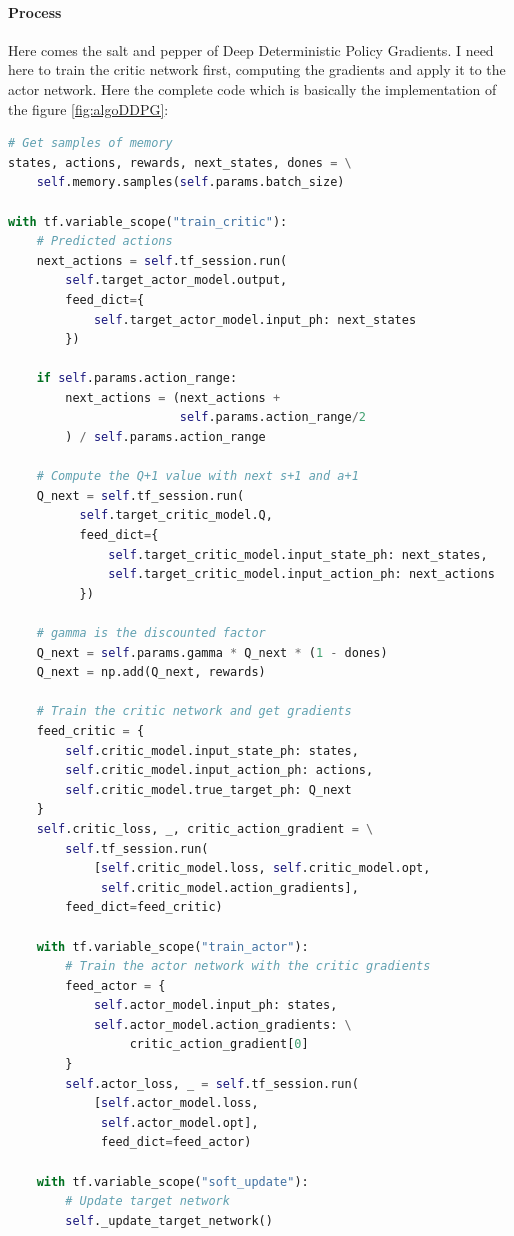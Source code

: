 \documentclass{article}
\begin{document}
\paragraph{Process}
Here comes the salt and pepper of Deep Deterministic Policy Gradients. I need
here to train the critic network first, computing the gradients and apply it to
the actor network. Here the complete code which is basically the implementation
of the figure \ref{fig:algoDDPG}:

\begin{lstlisting}[language=Python]
# Get samples of memory
states, actions, rewards, next_states, dones = \
    self.memory.samples(self.params.batch_size)

with tf.variable_scope("train_critic"):
    # Predicted actions
    next_actions = self.tf_session.run(
        self.target_actor_model.output,
        feed_dict={
            self.target_actor_model.input_ph: next_states
        })

    if self.params.action_range:
        next_actions = (next_actions +
                        self.params.action_range/2
        ) / self.params.action_range

    # Compute the Q+1 value with next s+1 and a+1
    Q_next = self.tf_session.run(
          self.target_critic_model.Q, 
          feed_dict={
              self.target_critic_model.input_state_ph: next_states,
              self.target_critic_model.input_action_ph: next_actions
          })

    # gamma is the discounted factor
    Q_next = self.params.gamma * Q_next * (1 - dones)
    Q_next = np.add(Q_next, rewards)

    # Train the critic network and get gradients
    feed_critic = {
        self.critic_model.input_state_ph: states,
        self.critic_model.input_action_ph: actions,
        self.critic_model.true_target_ph: Q_next
    }
    self.critic_loss, _, critic_action_gradient = \
        self.tf_session.run(
            [self.critic_model.loss, self.critic_model.opt,
             self.critic_model.action_gradients],
        feed_dict=feed_critic)

    with tf.variable_scope("train_actor"):
        # Train the actor network with the critic gradients
        feed_actor = {
            self.actor_model.input_ph: states,
            self.actor_model.action_gradients: \
                 critic_action_gradient[0]
        }
        self.actor_loss, _ = self.tf_session.run(
            [self.actor_model.loss,
             self.actor_model.opt],
             feed_dict=feed_actor)

    with tf.variable_scope("soft_update"):
        # Update target network
        self._update_target_network()
\end{lstlisting}
\end{document}
